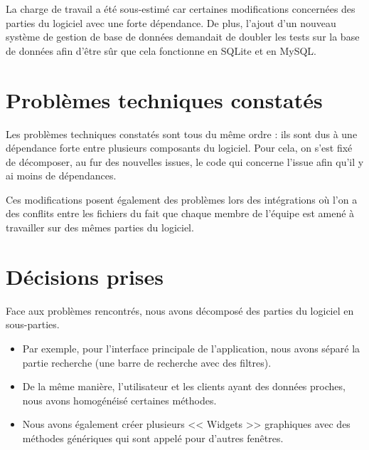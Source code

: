 \documentclass[12pt,a4paper,openany]{article}
\begin{document}
	La charge de travail a été sous-estimé car certaines modifications concernées des parties du logiciel avec une forte dépendance. De plus, l'ajout d'un nouveau système de gestion de base de données demandait de doubler les tests sur la base de données afin d'être sûr que cela fonctionne en SQLite et en MySQL.  

	
	\section{Problèmes techniques constatés}
	Les problèmes techniques constatés sont tous du même ordre : ils sont dus à une dépendance forte entre plusieurs composants du logiciel. Pour cela, on s'est fixé de décomposer, au fur des nouvelles issues, le code qui concerne l'issue afin qu'il y ai moins de dépendances. 
	
	Ces modifications posent également des problèmes lors des intégrations où l'on a des conflits entre les fichiers du fait que chaque membre de l'équipe est amené à travailler sur des mêmes parties du logiciel.

	\section{Décisions prises}
	Face aux problèmes rencontrés, nous avons décomposé des parties du logiciel en sous-parties. 
	\begin{itemize}
		\item Par exemple, pour l'interface principale de l'application, nous avons séparé la partie recherche (une barre de recherche avec des filtres). 
		\item De la même manière, l'utilisateur et les clients ayant des données proches, nous avons homogénéisé certaines méthodes. 
		\item Nous avons également créer plusieurs << Widgets >> graphiques avec des méthodes génériques qui sont appelé pour d'autres fenêtres.
	\end{itemize}

	
\end{document}
